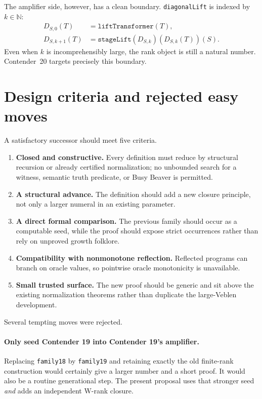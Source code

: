\documentclass[11pt]{article}
\theoremstyle{definition}
\theoremstyle{remark}
\newcommand{\N}{\mathbb{N}}
\newcommand{\code}[1]{\texttt{#1}}
\begin{document}
The amplifier side, however, has a clean boundary.  \code{diagonalLift} is
indexed by \(k\in\N\):
\begin{align*}
D_{S,0}(T)&=\code{liftTransformer}(T),\\
D_{S,k+1}(T)&=\code{stageLift}(D_{S,k})(D_{S,k}(T))(S).
\end{align*}
Even when \(k\) is incomprehensibly large, the rank object is still a natural
number.  Contender~20 targets precisely this boundary.

\section{Design criteria and rejected easy moves}

A satisfactory successor should meet five criteria.

\begin{enumerate}[leftmargin=*]
\item \textbf{Closed and constructive.}  Every definition must reduce by
  structural recursion or already certified normalization; no unbounded search
  for a witness, semantic truth predicate, or Busy Beaver is permitted.
\item \textbf{A structural advance.}  The definition should add a new closure
  principle, not only a larger numeral in an existing parameter.
\item \textbf{A direct formal comparison.}  The previous family should occur as
  a computable seed, while the proof should expose strict occurrences rather
  than rely on unproved growth folklore.
\item \textbf{Compatibility with nonmonotone reflection.}  Reflected programs
  can branch on oracle values, so pointwise oracle monotonicity is unavailable.
\item \textbf{Small trusted surface.}  The new proof should be generic and sit
  above the existing normalization theorems rather than duplicate the
  large-Veblen development.
\end{enumerate}

Several tempting moves were rejected.

\paragraph{Only seed Contender 19 into Contender 19's amplifier.}
Replacing \code{family18} by \code{family19} and retaining exactly the old
finite-rank construction would certainly give a larger number and a short
proof.  It would also be a routine generational step.  The present proposal
uses that stronger seed \emph{and} adds an independent W-rank closure.
\end{document}
